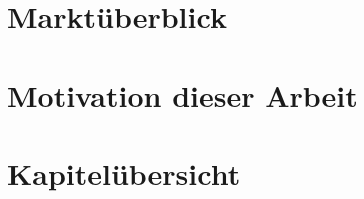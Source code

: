 \section{Marktüberblick} \label{sec:1-markt}


\section{Motivation dieser Arbeit} \label{sec:1-motivation}


\section{Kapitelübersicht} \label{sec:1-kapitel}


